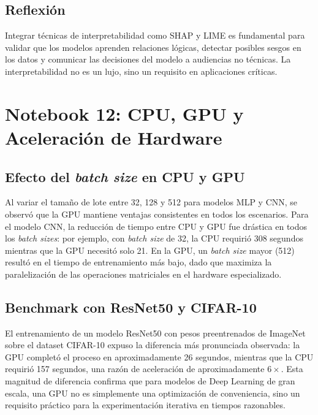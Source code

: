 \documentclass[12pt, a4paper]{article}
\begin{document}
\subsection{Reflexión}

Integrar técnicas de interpretabilidad como SHAP y LIME es fundamental para validar que los modelos aprenden relaciones lógicas, detectar posibles sesgos en los datos y comunicar las decisiones del modelo a audiencias no técnicas. La interpretabilidad no es un lujo, sino un requisito en aplicaciones críticas.

\section{Notebook 12: CPU, GPU y Aceleración de Hardware}

\subsection{Efecto del \textit{batch size} en CPU y GPU}

Al variar el tamaño de lote entre 32, 128 y 512 para modelos MLP y CNN, se observó que la GPU mantiene ventajas consistentes en todos los escenarios. Para el modelo CNN, la reducción de tiempo entre CPU y GPU fue drástica en todos los \textit{batch sizes}: por ejemplo, con \textit{batch size} de 32, la CPU requirió 308 segundos mientras que la GPU necesitó solo 21. En la GPU, un \textit{batch size} mayor (512) resultó en el tiempo de entrenamiento más bajo, dado que maximiza la paralelización de las operaciones matriciales en el hardware especializado.

\newpage
\subsection{Benchmark con ResNet50 y CIFAR-10}

El entrenamiento de un modelo ResNet50 con pesos preentrenados de ImageNet sobre el dataset CIFAR-10 expuso la diferencia más pronunciada observada: la GPU completó el proceso en aproximadamente 26 segundos, mientras que la CPU requirió 157 segundos, una razón de aceleración de aproximadamente $6\times$. Esta magnitud de diferencia confirma que para modelos de Deep Learning de gran escala, una GPU no es simplemente una optimización de conveniencia, sino un requisito práctico para la experimentación iterativa en tiempos razonables.
\end{document}
